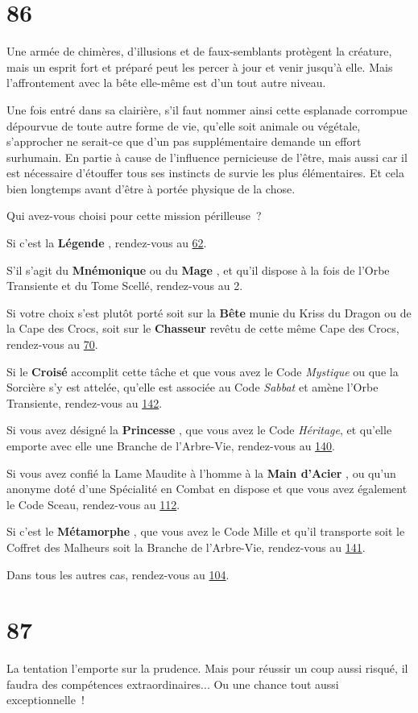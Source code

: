 \documentclass{report}
\newcommand{\gsection}[1]{
    \section{#1}
    \label{section-#1}
}
\newcommand{\glink}[1]{\hyperref[section-#1]{#1}}
\newcommand{\hero}[1]{
    \textbf{#1}
}
\begin{document}
\gsection{86}

Une armée de chimères, d'illusions et de faux-semblants protègent la créature, mais un esprit fort et préparé peut les percer à jour et venir jusqu'à elle. Mais l'affrontement avec la bête elle-même est d'un tout autre niveau.

Une fois entré dans sa clairière, s'il faut nommer ainsi cette esplanade corrompue dépourvue de toute autre forme de vie, qu'elle soit animale ou végétale, s'approcher ne serait-ce que d'un pas supplémentaire demande un effort surhumain. En partie à cause de l'influence pernicieuse de l'être, mais aussi car il est nécessaire d'étouffer tous ses instincts de survie les plus élémentaires. Et cela bien longtemps avant d'être à portée physique de la chose.

Qui avez-vous choisi pour cette mission périlleuse ?

Si c'est la \hero{Légende}, rendez-vous au \glink{62}.

S'il s'agit du \hero{Mnémonique} ou du \hero{Mage}, et qu'il dispose à la fois de l'Orbe Transiente et du Tome Scellé, rendez-vous au 2.

Si votre choix s'est plutôt porté soit sur la \hero{Bête} munie du Kriss du Dragon ou de la Cape des Crocs, soit sur le \hero{Chasseur} revêtu de cette même Cape des Crocs, rendez-vous au \glink{70}.

Si le \hero{Croisé} accomplit cette tâche et que vous avez le Code \emph{Mystique} ou que la Sorcière s'y est attelée, qu'elle est associée au Code \emph{Sabbat} et amène l'Orbe Transiente, rendez-vous au \glink{142}.

Si vous avez désigné la \hero{Princesse}, que vous avez le Code \emph{Héritage}, et qu'elle emporte avec elle une Branche de l'Arbre-Vie, rendez-vous au \glink{140}.

Si vous avez confié la Lame Maudite à l'homme à la \hero{Main d'Acier}, ou qu'un anonyme doté d'une Spécialité en Combat en dispose et que vous avez également le Code Sceau, rendez-vous au \glink{112}.

Si c'est le \hero{Métamorphe}, que vous avez le Code Mille et qu'il transporte soit le Coffret des Malheurs soit la Branche de l'Arbre-Vie, rendez-vous au \glink{141}.

Dans tous les autres cas, rendez-vous au \glink{104}.

\gsection{87}

La tentation l'emporte sur la prudence. Mais pour réussir un coup aussi risqué, il faudra des compétences extraordinaires... Ou une chance tout aussi exceptionnelle !
\end{document}
